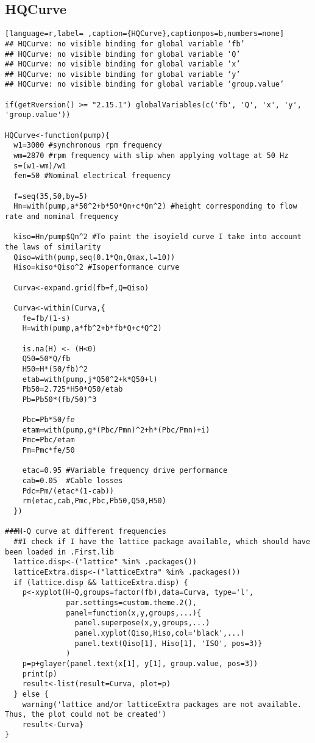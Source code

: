 \subsection{HQCurve}
\label{sec:orgd0d511c}
\label{subsec:hqcurve}
\begin{lstlisting}[language=r,label= ,caption={HQCurve},captionpos=b,numbers=none]
## HQCurve: no visible binding for global variable ‘fb’
## HQCurve: no visible binding for global variable ‘Q’
## HQCurve: no visible binding for global variable ‘x’
## HQCurve: no visible binding for global variable ‘y’
## HQCurve: no visible binding for global variable ‘group.value’

if(getRversion() >= "2.15.1") globalVariables(c('fb', 'Q', 'x', 'y', 'group.value'))

HQCurve<-function(pump){
  w1=3000 #synchronous rpm frequency
  wm=2870 #rpm frequency with slip when applying voltage at 50 Hz
  s=(w1-wm)/w1
  fen=50 #Nominal electrical frequency

  f=seq(35,50,by=5)
  Hn=with(pump,a*50^2+b*50*Qn+c*Qn^2) #height corresponding to flow rate and nominal frequency

  kiso=Hn/pump$Qn^2 #To paint the isoyield curve I take into account the laws of similarity
  Qiso=with(pump,seq(0.1*Qn,Qmax,l=10))
  Hiso=kiso*Qiso^2 #Isoperformance curve

  Curva<-expand.grid(fb=f,Q=Qiso)

  Curva<-within(Curva,{
    fe=fb/(1-s)
    H=with(pump,a*fb^2+b*fb*Q+c*Q^2)

    is.na(H) <- (H<0)
    Q50=50*Q/fb
    H50=H*(50/fb)^2
    etab=with(pump,j*Q50^2+k*Q50+l)
    Pb50=2.725*H50*Q50/etab
    Pb=Pb50*(fb/50)^3

    Pbc=Pb*50/fe
    etam=with(pump,g*(Pbc/Pmn)^2+h*(Pbc/Pmn)+i)
    Pmc=Pbc/etam
    Pm=Pmc*fe/50

    etac=0.95 #Variable frequency drive performance
    cab=0.05  #Cable losses
    Pdc=Pm/(etac*(1-cab))
    rm(etac,cab,Pmc,Pbc,Pb50,Q50,H50)
  })

###H-Q curve at different frequencies
  ##I check if I have the lattice package available, which should have been loaded in .First.lib
  lattice.disp<-("lattice" %in% .packages())
  latticeExtra.disp<-("latticeExtra" %in% .packages())
  if (lattice.disp && latticeExtra.disp) {
    p<-xyplot(H~Q,groups=factor(fb),data=Curva, type='l',
              par.settings=custom.theme.2(),
              panel=function(x,y,groups,...){
                panel.superpose(x,y,groups,...)
                panel.xyplot(Qiso,Hiso,col='black',...)
                panel.text(Qiso[1], Hiso[1], 'ISO', pos=3)}
              )
    p=p+glayer(panel.text(x[1], y[1], group.value, pos=3))
    print(p)
    result<-list(result=Curva, plot=p)
  } else {
    warning('lattice and/or latticeExtra packages are not available. Thus, the plot could not be created')
    result<-Curva}
}
\end{lstlisting}
